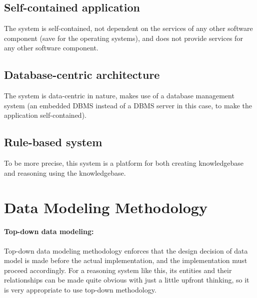 \documentclass[../gr-final.tex]{subfiles}
\begin{document}
\subsection{Self-contained application} The system is self-contained,
not dependent on the services of any other software component (save
for the operating systems), and does not provide services for any
other software component. 
\subsection{Database-centric architecture} The system is data-centric
in nature, makes use of a database management system (an embedded DBMS
instead of a DBMS server in this case, to make the application
self-contained).
\subsection{Rule-based system} To be more precise, this system is a
platform for both creating knowledgebase and reasoning using the knowledgebase.

\section{Data Modeling Methodology}
\paragraph{Top-down data modeling: } Top-down data modeling methodology enforces that the
design decision of data model is made before the actual
implementation, and the implementation must proceed accordingly. For a
reasoning system like this, its entities and their relationships can
be made quite obvious with just a little upfront thinking, so it is
very appropriate to use top-down methodology.
\end{document}
